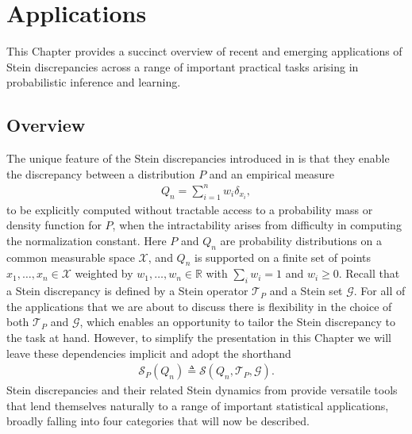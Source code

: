 \documentclass[12pt,paper=letter]{scrreprt}
\def\defeq{\triangleq} %
\begin{document}
\chapter{Applications} 
\label{sec:ksd_application} 

This Chapter provides a succinct overview of recent and emerging applications of Stein discrepancies across a range of important practical tasks arising in probabilistic inference and learning.



\section{Overview} 

The unique feature of the Stein discrepancies  introduced in  is that they enable the discrepancy between a distribution $P$ and an empirical measure 
\begin{align}
Q_n = \sum_{i=1}^n w_i \delta_{x_i}, \label{eq: generic empirical measure}
\end{align}
to be explicitly computed without tractable access to a probability mass or density function for $P$, when the intractability arises from difficulty in computing the normalization constant.
Here $P$ and $Q_n$ are probability distributions on a common measurable space $\mathcal{X}$, and $Q_n$ is supported on a finite set of points $x_1 , \dots , x_n \in \mathcal{X}$ weighted by $w_1 , \dots , w_n \in \mathbb{R}$ with $\sum_i w_i = 1$ and $w_i\geq 0$. 
Recall that a Stein discrepancy is defined by a Stein operator $\mathcal{T}_P$ and a Stein set $\mathcal{G}$.
For all of the applications that we are about to discuss there is flexibility in the choice of both $\mathcal{T}_P$ and $\mathcal{G}$, which enables an opportunity to tailor the Stein discrepancy to the task at hand.
However, to simplify the presentation in this Chapter we will leave these dependencies implicit and adopt the shorthand
\begin{align*}
    \mathcal{S}_P(Q_n) \defeq \mathcal{S}(Q_n,\mathcal{T}_P,\mathcal{G}) .
\end{align*}
Stein discrepancies and their related Stein dynamics from  provide versatile tools that lend themselves naturally to a range of important statistical applications, broadly falling into four categories that will now be described.
\end{document}
